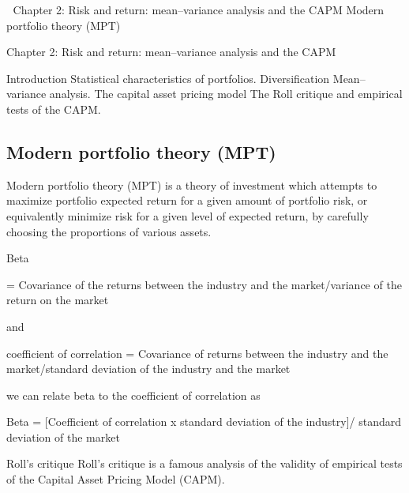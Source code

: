 

Chapter 2: Risk and return: mean–variance analysis and the CAPM
Modern portfolio theory (MPT)

Chapter 2: Risk and return: mean–variance analysis and the CAPM

Introduction
Statistical characteristics of portfolios.
Diversification
Mean–variance analysis. 
The capital asset pricing model 
The Roll critique and empirical tests of the CAPM.


\subsection{Modern portfolio theory (MPT)}
Modern portfolio theory (MPT) is a theory of investment which attempts to maximize portfolio expected return for a given amount of portfolio risk, or equivalently minimize risk for a given level of expected return, by carefully choosing the proportions of various assets. 

Beta

= Covariance of the returns between the industry and the market/variance of the return on the market 

and 

coefficient of correlation = Covariance of returns between the industry and the market/standard deviation of the industry and the market 

we can relate beta to the coefficient of correlation as

Beta = [Coefficient of correlation x standard deviation of the industry]/ standard deviation of the market


Roll's critique
Roll's critique is a famous analysis of the validity of empirical tests of the Capital Asset Pricing Model (CAPM).
